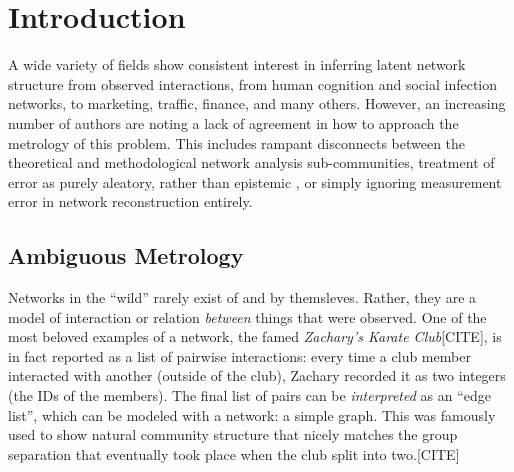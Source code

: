 \documentclass[%
	12pt,
		oneside,
		letterpaper
]{book}
\renewcommand{\contentsname}%
    {Table of contents}%
\renewcommand*\contentsname{Table of contents}
\newcommand\contentsname{Table of contents}
\begin{document}
    \renewcommand{\contentsname}{List of Tables}
\listoftables %
\newpage

    \renewcommand{\contentsname}{List of Figures}
\listoffigures %
\newpage

% 

\newpage
\setlength{\parskip}{0em}
\renewcommand{\baselinestretch}{2}
\small\normalsize



\chapter{Introduction}\label{introduction}

A wide variety of fields show consistent interest in inferring latent
network structure from observed interactions, from human cognition and
social infection networks, to marketing, traffic, finance, and many
others. \autocite{Inferringnetworksdiffusion_GomezRodriguez2012}
However, an increasing number of authors are noting a lack of agreement
in how to approach the metrology of this problem. This includes rampant
disconnects between the theoretical and methodological network analysis
sub-communities\autocite{Statisticalinferencelinks_Peel2022}, treatment
of error as purely aleatory, rather than epistemic
\autocite{Measurementerrornetwork_Wang2012}, or simply ignoring
measurement error in network reconstruction
entirely\autocite{ReconstructingNetworksUnknown_Peixoto2018}.

\section{Ambiguous Metrology}\label{ambiguous-metrology}

Networks in the ``wild'' rarely exist of and by themsleves. Rather, they
are a model of interaction or relation \emph{between} things that were
observed. One of the most beloved examples of a network, the famed
\emph{Zachary's Karate Club}{[}CITE{]}, is in fact reported as a list of
pairwise interactions: every time a club member interacted with another
(outside of the club), Zachary recorded it as two integers (the IDs of
the members). The final list of pairs can be \emph{interpreted} as an
``edge list'', which can be modeled with a network: a simple graph. This
was famously used to show natural community structure that nicely
matches the group separation that eventually took place when the club
split into two.{[}CITE{]}
\end{document}
